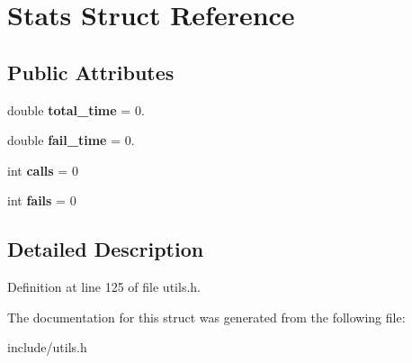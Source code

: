 \hypertarget{structStats}{}\section{Stats Struct Reference}
\label{structStats}
\subsection*{Public Attributes}
\begin{DoxyCompactItemize}
\item 
\mbox{\label{structStats_a70d36c1b69ef6756355c1203bc705c55}} 
double {\bfseries total\+\_\+time} = 0.
\item 
\mbox{\label{structStats_aee859c4519969281cad6bf9ea94deb9a}} 
double {\bfseries fail\+\_\+time} = 0.
\item 
\mbox{\label{structStats_a14faefc9acb2ce7d266c3673e37da7ee}} 
int {\bfseries calls} = 0
\item 
\mbox{\label{structStats_a24c80aca6cdab995eadceaec3a0a4803}} 
int {\bfseries fails} = 0
\end{DoxyCompactItemize}


\subsection{Detailed Description}


Definition at line 125 of file utils.\+h.



The documentation for this struct was generated from the following file\+:\begin{DoxyCompactItemize}
\item 
include/utils.\+h\end{DoxyCompactItemize}
